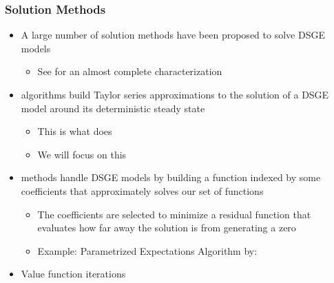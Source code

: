 \documentclass[xcolor=dvipsnames,handout,aspectratio=169]{beamer}
\let\oldcite=\cite
\renewcommand\cite[1]{\hypersetup{linkcolor=blue} \hyperlink{#1}{\oldcite{#1}}}
\begin{document}
\begin{frame}[c]\frametitle {\textbf{Solution Methods}} \label{conclusion}
\begin{itemize}
\item A large number of solution methods have been proposed to solve DSGE models
\begin{itemize}
    \item See \cite{fernandez2016solution} for an almost complete characterization
\end{itemize}
\item {\color{Magenta}{Perturbation}} algorithms build Taylor series approximations to the solution of a DSGE model around its deterministic steady state 
\begin{itemize}
    \item This is what {\color{blue}{Dynare}} does
    \item We will focus on this
\end{itemize}
\item {\color{Magenta}{Projection}} methods handle DSGE models by building a function indexed by some coefficients that approximately solves our set of functions
\begin{itemize}
    \item The coefficients are selected to minimize a residual function that evaluates how far away the solution is from generating a zero 
    \item Example: Parametrized Expectations Algorithm by:\cite{den1990solving} 
\end{itemize}
\item Value function iterations 
\end{itemize}
\end{frame}



 
\end{document}
